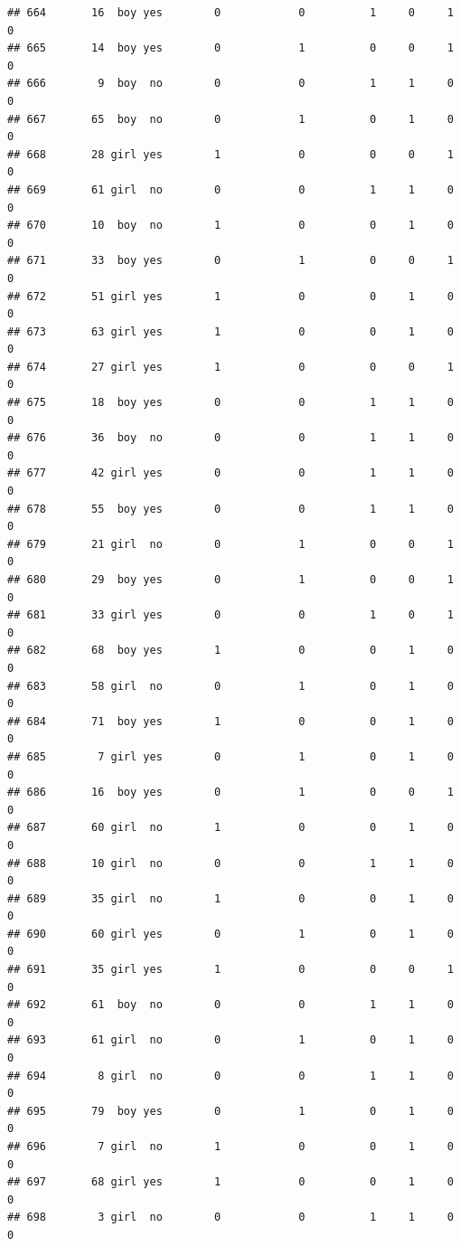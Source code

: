 \documentclass[man]{apa6}
\begin{document}
\begin{verbatim}
## 664       16  boy yes        0            0          1     0     1     0
## 665       14  boy yes        0            1          0     0     1     0
## 666        9  boy  no        0            0          1     1     0     0
## 667       65  boy  no        0            1          0     1     0     0
## 668       28 girl yes        1            0          0     0     1     0
## 669       61 girl  no        0            0          1     1     0     0
## 670       10  boy  no        1            0          0     1     0     0
## 671       33  boy yes        0            1          0     0     1     0
## 672       51 girl yes        1            0          0     1     0     0
## 673       63 girl yes        1            0          0     1     0     0
## 674       27 girl yes        1            0          0     0     1     0
## 675       18  boy yes        0            0          1     1     0     0
## 676       36  boy  no        0            0          1     1     0     0
## 677       42 girl yes        0            0          1     1     0     0
## 678       55  boy yes        0            0          1     1     0     0
## 679       21 girl  no        0            1          0     0     1     0
## 680       29  boy yes        0            1          0     0     1     0
## 681       33 girl yes        0            0          1     0     1     0
## 682       68  boy yes        1            0          0     1     0     0
## 683       58 girl  no        0            1          0     1     0     0
## 684       71  boy yes        1            0          0     1     0     0
## 685        7 girl yes        0            1          0     1     0     0
## 686       16  boy yes        0            1          0     0     1     0
## 687       60 girl  no        1            0          0     1     0     0
## 688       10 girl  no        0            0          1     1     0     0
## 689       35 girl  no        1            0          0     1     0     0
## 690       60 girl yes        0            1          0     1     0     0
## 691       35 girl yes        1            0          0     0     1     0
## 692       61  boy  no        0            0          1     1     0     0
## 693       61 girl  no        0            1          0     1     0     0
## 694        8 girl  no        0            0          1     1     0     0
## 695       79  boy yes        0            1          0     1     0     0
## 696        7 girl  no        1            0          0     1     0     0
## 697       68 girl yes        1            0          0     1     0     0
## 698        3 girl  no        0            0          1     1     0     0

\end{verbatim}
\end{document}

